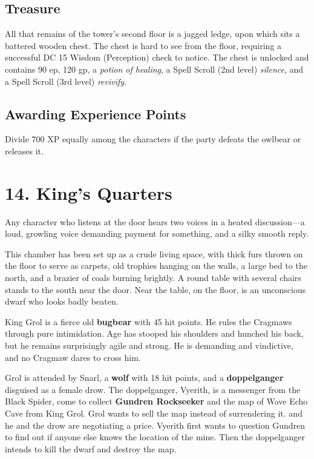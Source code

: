 \documentclass[10pt,a4paper,twoside,bg=print,twocolumn,openany,nodeprecatedcode]{dndbook}
\begin{document}
\subsection{Treasure}
All that remains of the tower's second floor is a jagged ledge, upon which sits a battered wooden chest. The chest is hard to see from the floor, requiring a successful DC 15 Wisdom (Perception) check to notice. The chest is unlocked and contains 90 ep, 120 gp, a \textit{potion of healing}, a Spell Scroll (2nd level) \textit{silence}, and a Spell Scroll (3rd level) \textit{revivify}.

\subsection{Awarding Experience Points}
Divide 700 XP equally among the characters if the party defeats the owlbear or releases it.

\section{14. King's Quarters}
Any character who listens at the door hears two voices in a heated discussion—a loud, growling voice demanding payment for something, and a silky smooth reply.

\begin{DndReadAloud}{}
This chamber has been set up as a crude living space, with thick furs thrown on the floor to serve as carpets, old trophies hanging on the walls, a large bed to the north, and a brazier of coals burning brightly. A round table with several chairs stands to the south near the door. Near the table, on the floor, is an unconscious dwarf who looks badly beaten.

\end{DndReadAloud}

King Grol is a fierce old \textbf{bugbear} with 45 hit points. He rules the Cragmaws through pure intimidation. Age has stooped his shoulders and hunched his back, but he remains surprisingly agile and strong. He is demanding and vindictive, and no Cragmaw dares to cross him.

Grol is attended by Snarl, a \textbf{wolf} with 18 hit points, and a \textbf{doppelganger} disguised as a female drow. The doppelganger, Vyerith, is a messenger from the Black Spider, come to collect \textbf{Gundren Rockseeker} and the map of Wave Echo Cave from King Grol. Grol wants to sell the map instead of surrendering it. and he and the drow are negotiating a price. Vyerith first wants to question Gundren to find out if anyone else knows the location of the mine. Then the doppelganger intends to kill the dwarf and destroy the map.
\end{document}
